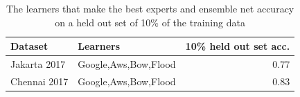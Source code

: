 \begin{table}
\centering

\begin{tabular}{llr}
\toprule
      Dataset &              Learners &  10\% held out set acc.\\
\hline
 Jakarta 2017 &         Google,Aws,Bow,Flood &              0.77 \\
\midrule
 Chennai 2017 &  Google,Aws,Bow,Flood &              0.83 \\
\bottomrule
\end{tabular}

\caption{The learners that make the best experts and ensemble net accuracy on a
  held out set of 10\% of the training data}\label{table:ensemble_short_acc}
\end{table}
